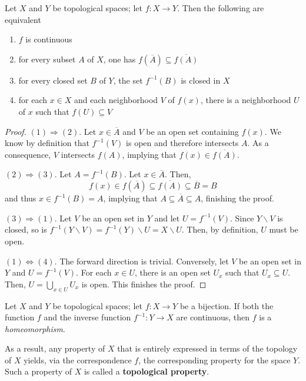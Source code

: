 \begin{theorem}
    Let $X$ and $Y$ be topological spaces; let $f:X\to Y$. Then the following are equivalent 
    \begin{enumerate}
        \item $f$ is continuous 
        \item for every subset $A$ of $X$, one has $f(\overline{A})\subseteq\overline{f(A)}$ 
        \item for every closed set $B$ of $Y$, the set $f^{-1}(B)$ is closed in $X$ 
        \item for each $x\in X$ and each neighborhood $V$ of $f(x)$, there is a neighborhood $U$ of $x$ such that $f(U)\subseteq V$
    \end{enumerate}
\end{theorem}
\begin{proof}
    $(1)\Rightarrow(2)$. Let $x\in\overline{A}$ and $V$ be an open set containing $f(x)$. We know by definition that $f^{-1}(V)$ is open and therefore intersects $A$. As a consequence, $V$ intersects $f(A)$, implying that $f(x)\in\overline{f(A)}$.

    $(2)\Rightarrow(3)$. Let $A = f^{-1}(B)$. Let $x\in\overline{A}$. Then, 
    \begin{equation*}
        f(x)\in f(\overline{A})\subseteq\overline{f(A)}\subseteq\overline{B} = B
    \end{equation*}
    and thus $x\in f^{-1}(B) = A$, implying that $A\subseteq\overline{A}\subseteq A$, finishing the proof.

    $(3)\Rightarrow(1)$. Let $V$ be an open set in $Y$ and let $U = f^{-1}(V)$. Since $Y\backslash V$ is closed, so is $f^{-1}(Y\backslash V) = f^{-1}(Y)\backslash U = X\backslash U$. Then, by definition, $U$ must be open.

    $(1)\Leftrightarrow(4)$. The forward direction is trivial. Conversely, let $V$ be an open set in $Y$ and $U = f^{-1}(V)$. For each $x\in U$, there is an open set $U_x$ such that $U_x\subseteq U$. Then, $U = \bigcup_{x\in U}U_x$ is open. This finishes the proof.
\end{proof}

\begin{definition}[Homeomorphism]
    Let $X$ and $Y$ be topological spaces; let $f:X\to Y$ be a bijection. If both the function $f$ and the inverse function $f^{-1}:Y\to X$ are continuous, then $f$ is a \textit{homeomorphism}.
\end{definition}

As a result, any property of $X$ that is entirely expressed in terms of the topology of $X$ yields, via the correspondence $f$, the corresponding property for the space $Y$. Such a property of $X$ is called a \textbf{topological property}.

